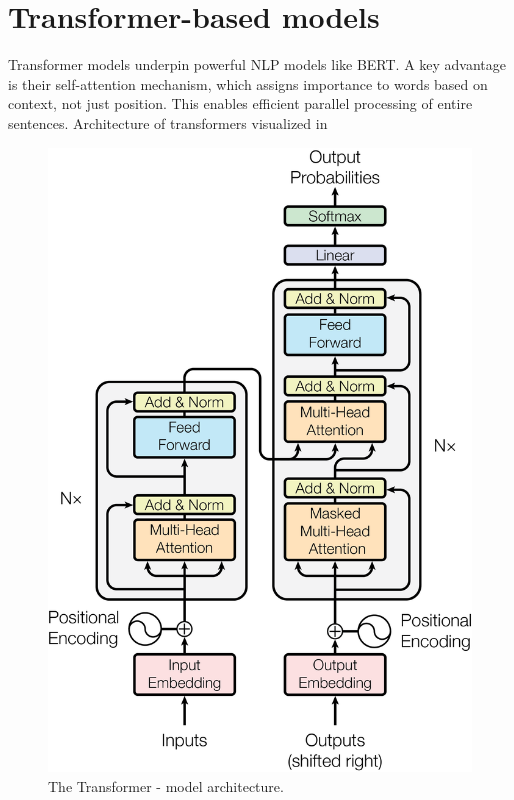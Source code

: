 \section{Transformer-based models}
Transformer models \cite{vaswani2023attention} \nocite{umarjamilai} underpin powerful NLP models like BERT.
A key advantage is their self-attention mechanism, which assigns importance to words based on context, not just position.
This enables efficient parallel processing of entire sentences.
Architecture of transformers visualized in 

\begin{figure}[h]
    \centering
    \includegraphics[scale=0.6]{src/fig/imgs/transformer_arch.png}
    \caption{The Transformer - model architecture.}
    \label{fig:model-arch}
\end{figure}

